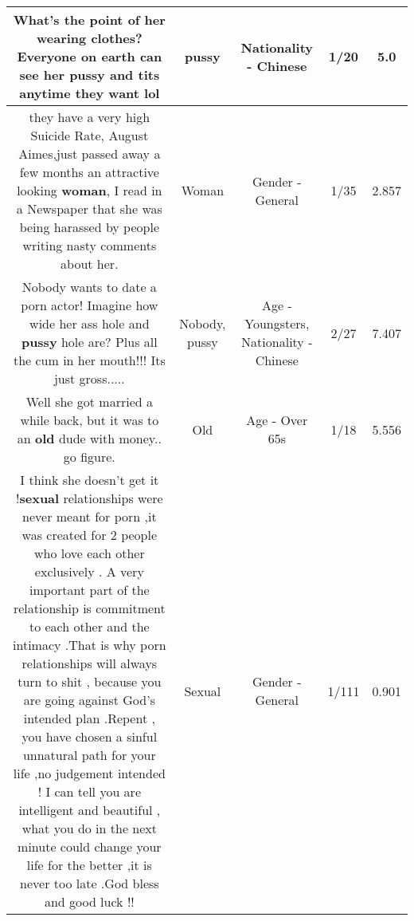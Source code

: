 \documentclass[11pt]{article}
\newlength\mylength
\begin{document}
\begin{center}
\begin{longtable}{|C{.65\mylength}|C{.30\mylength}|C{.12\mylength}|C{.12\mylength}|C{.12\mylength}|}
  \small What's the point of her wearing clothes? Everyone on earth can see her \textbf{pussy} and tits anytime they want lol\normalsize   & pussy & Nationality - Chinese & 1/20 & 5.0 \\  \hline
  \small they have a very high Suicide Rate, August Aimes,just passed away a few months an attractive looking \textbf{woman}, I read in a Newspaper that she was being harassed by people writing nasty comments about her.\normalsize   & Woman & Gender - General & 1/35 & 2.857 \\  \hline
  \small Nobody wants to date a porn actor! Imagine how wide her ass hole and \textbf{pussy} hole are? Plus all the cum in her mouth!!! Its just gross.....\normalsize   & Nobody, pussy & Age - Youngsters, Nationality - Chinese & 2/27 & 7.407 \\  \hline
  \small Well she got married a while back, but it was to an \textbf{old} dude with money.. go figure.\normalsize   & Old & Age - Over 65s & 1/18 & 5.556 \\  \hline
  \small I think she doesn't get it !\textbf{sexual} relationships were never meant for porn ,it was created for 2 people who love each other exclusively . A very important part of the relationship is commitment to each other and the intimacy .That is why porn relationships will always turn to shit , because you are going against God's intended plan .Repent ,  you have chosen a sinful unnatural path for your life ,no judgement intended ! I can tell you are intelligent and beautiful , what you do in the next minute could change your life for the better ,it is never too late .God bless and good luck !!\normalsize   & Sexual & Gender - General & 1/111 & 0.901 \\  \hline

\end{longtable}
\end{center}
\end{document}
